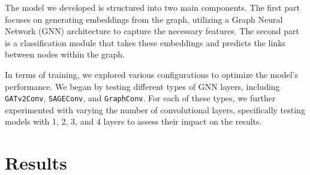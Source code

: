 \documentclass[11pt]{article}
\begin{document}
The model we developed is structured into two main components. 
%
The first part focuses on generating embeddings from the graph, 
  utilizing a Graph Neural Network (GNN) architecture to capture the necessary features. 
%  
The second part is a classification module that takes these embeddings and predicts the links 
  between nodes within the graph.

In terms of training, we explored various configurations to optimize the model's performance.
%
We began by testing different types of GNN layers, including \texttt{GATv2Conv}, \texttt{SAGEConv}, and \texttt{GraphConv}. 
%
For each of these types, we further experimented with varying the number of convolutional layers, 
  specifically testing models with 1, 2, 3, and 4 layers to assess their impact on the results.

\section{Results}\label{sec:resutls}
\end{document}
